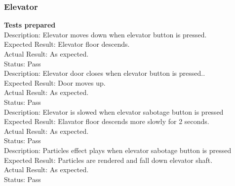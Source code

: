 \documentclass[11pt,a4paper]{article}
\begin{document}
\subsubsection{Elevator}
\textbf{Tests prepared}\\
Description: Elevator moves down when elevator button is pressed.\\
Expected Result: Elevator floor descends.\\
Actual Result: As expected.\\
Status: Pass
\smallskip\\
Description: Elevator door closes when elevator button is pressed..\\
Expected Result: Door moves up.\\
Actual Result: As expected.\\
Status: Pass
\smallskip\\
Description: Elevator is slowed when elevator sabotage button is pressed\\
Expected Result: Elavator floor descends more slowly for 2 seconds.\\
Actual Result: As expected.\\
Status: Pass
\smallskip\\
Description: Particles effect plays when elevator sabotage button is pressed\\
Expected Result: Particles are rendered and fall down elevator shaft.\\
Actual Result: As expected.\\
Status: Pass
\end{document}
